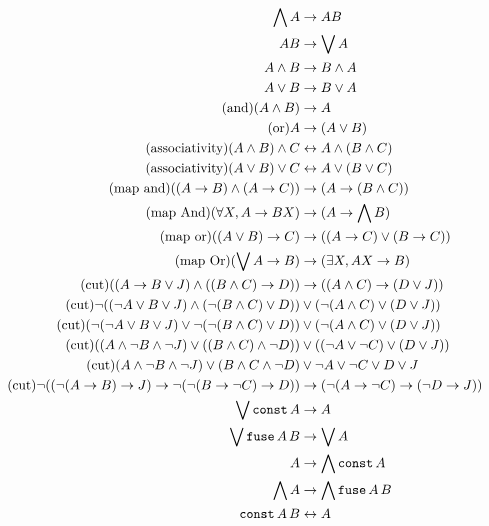 \documentclass{article}
\begin{document}
  \begin{align*}
    \bigwedge A &\to AB\\
    AB &\to \bigvee A\\
    A \wedge B &\to B \wedge A\\
    A \vee B &\to B \vee A\\
    \tag{and}
    (A \wedge B) &\to A\\
    \tag{or}
    A &\to (A \vee B)\\
    \tag{associativity}
    (A \wedge B) \wedge C &\leftrightarrow A \wedge (B \wedge C)\\
    \tag{associativity}
    (A \vee B) \vee C &\leftrightarrow A \vee (B \vee C)\\
    \tag{map and}
    ((A \to B) \wedge (A \to C)) &\to (A \to (B \wedge C))\\
    \tag{map And}
    (\forall X, A \to B X) &\to (A \to \bigwedge B)\\
    \tag{map or}
    ((A \vee B) \to C) &\to ((A \to C) \vee (B \to C))\\
    \tag{map Or}
    (\bigvee A \to B) &\to (\exists X, A X \to B)\\
    \tag{cut}
    ((A \to B \vee J) \wedge ((B \wedge C) \to D)) &\to ((A \wedge C) \to (D \vee J))\\
    \tag{cut}
    \neg ((\neg A \vee B \vee J) \wedge (\neg (B \wedge C) \vee D)) &\vee (\neg (A \wedge C) \vee (D \vee J))\\
    \tag{cut}
    (\neg (\neg A \vee B \vee J) \vee \neg (\neg (B \wedge C) \vee D)) &\vee (\neg (A \wedge C) \vee (D \vee J))\\
    \tag{cut}
    ((A \wedge \neg B \wedge \neg J) \vee ((B \wedge C) \wedge \neg D)) &\vee ((\neg A \vee \neg C) \vee (D \vee J))\\
    \tag{cut}
    (A \wedge \neg B \wedge \neg J) \vee (B \wedge C \wedge \neg D) &\vee \neg A \vee \neg C \vee D \vee J\\
    \tag{cut}
    \neg((\neg(A \to B) \to J) \to \neg (\neg (B \to \neg C) \to D)) &\to (\neg (A \to \neg C) \to (\neg D \to J))\\
    \bigvee \operatorname{\texttt{const}} A &\to A\\
    \bigvee \operatorname{\texttt{fuse}} A\, B &\to \bigvee A\\
    A &\to \bigwedge \operatorname{\texttt{const}} A\\
    \bigwedge A &\to \bigwedge \operatorname{\texttt{fuse}} A\,B\\
    \operatorname{\texttt{const}} A\,B &\leftrightarrow A
  \end{align*}
\end{document}
